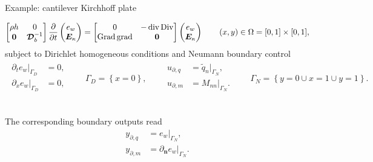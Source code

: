 \documentclass[aspectratio=169]{ISAE-Beamer}
\DeclareMathOperator*{\grad}{grad}
\DeclareMathOperator*{\Grad}{Grad}
\DeclareMathOperator*{\Div}{Div}
\renewcommand{\div}{\operatorname{div}}
\begin{document}
\begin{frame}{Example: cantilever Kirchhoff plate}

\begin{equation*}
\begin{bmatrix}
\rho h & 0 \\ 
\bm{0} & \bm{\mathcal{D}}_b^{-1} \\
\end{bmatrix}
\diffp{}{t}
\begin{pmatrix}
e_w \\ \bm{E}_\kappa \\
\end{pmatrix} = 
\begin{bmatrix}
0 & -\div\Div \\ 
\Grad\grad & \bm{0} \\
\end{bmatrix}
\begin{pmatrix}
e_w \\ \bm{E}_\kappa \\
\end{pmatrix} \qquad (x, y) \in \Omega = [0, 1]\times[0,1],
\end{equation*}
subject to Dirichlet homogeneous conditions and Neumann boundary control
\begin{align*}
\begin{aligned}
\partial_t e_w|_{\Gamma_D} &= 0, \\
\partial_x e_w|_{\Gamma_D} &= 0, \\
\end{aligned} \qquad {\Gamma_D} = \left\{x = 0 \right\}, \qquad
\begin{aligned}
u_{\partial, q} & = \widetilde{q}_n|_{\Gamma_N},\\
u_{\partial, m} &= M_{nn}|_{\Gamma_N}.\\
\end{aligned} \qquad {\Gamma_N} = \left\{y = 0 \cup x=1 \cup y=1 \right\}.
\end{align*}

\begin{columns}
	\begin{column}{.5\textwidth}
		The corresponding boundary outputs read
		\begin{equation*}
		\begin{aligned}
		y_{\partial, q} &= e_w|_{\Gamma_N}, \\
		y_{\partial, m} &=\partial_{\bm{n}} e_w|_{\Gamma_N}.
		\end{aligned}
		\end{equation*}
		

\end{column}
\end{columns}
\end{frame}
\end{document}
